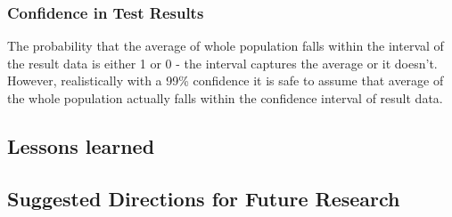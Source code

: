  \subsubsection{Confidence in Test Results}
The probability that the average of whole population falls within the interval of the result data is either 1 or 0 - the interval captures the average or it doesn't. However, realistically with a 99\% confidence it is safe to assume that average of the whole population actually falls within the confidence interval of result data.


\subsection{Lessons learned}
\subsection{Suggested Directions for Future Research}